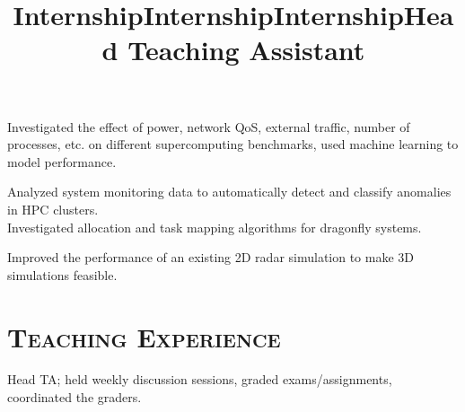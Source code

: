 \begin{resume}
	\title{Internship}
	\begin{position}
    Investigated the effect of power, network QoS, external traffic, number of
    processes, etc. on different supercomputing benchmarks, used machine
    learning to model performance.
	\end{position}
	
\vspace{0.1in}
	\title{Internship}
	\begin{position}
		Analyzed system monitoring data to automatically detect and classify
    anomalies in HPC clusters. \\
    Investigated allocation and task mapping algorithms for dragonfly systems.
	\end{position}
	
\vspace{0.1in}
	\title{Internship}
	\begin{position}
		Improved the performance of an existing 2D radar simulation to make 3D
    simulations feasible.
	\end{position}
	
	
	\section{\textsc{Teaching Experience}}
	
	\title{Head Teaching Assistant}
	\begin{position}
		Head TA; held weekly discussion sessions, graded exams/assignments, coordinated the
    graders.  
	\end{position}
  

\end{resume}
